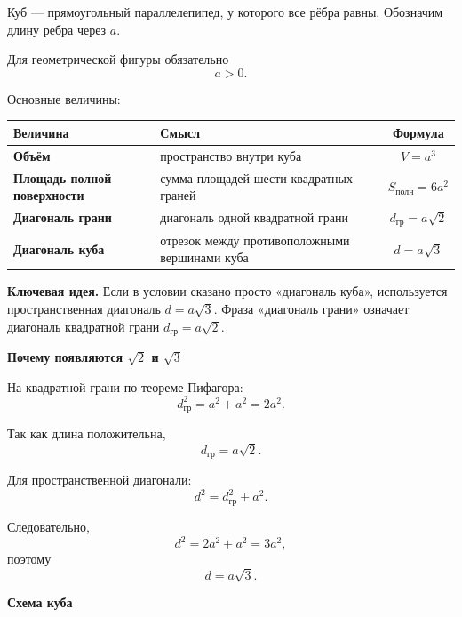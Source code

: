 \documentclass[a4paper,12pt]{article}
\newcommand{\subsectiontitle}[1]{%
    \vspace{0.4em}
    {\large\bfseries\color{darkaccent}#1}\par
    \vspace{0.2em}
}
\newcommand{\keyidea}[1]{%
    \par\medskip
    {\bfseries\color{darkaccent}Ключевая идея.} #1
    \par\medskip
}
\begin{document}
Куб --- прямоугольный параллелепипед, у которого все рёбра равны.
Обозначим длину ребра через \(a\).

Для геометрической фигуры обязательно
\[
a>0.
\]

Основные величины:

\begin{center}
\renewcommand{\arraystretch}{1.4}

\begin{tabularx}{0.94\linewidth}{@{}>{\bfseries}l X c@{}}
\toprule

Величина
&
Смысл
&
Формула
\\

\midrule

Объём
&
пространство внутри куба
&
\(V=a^3\)
\\

Площадь полной поверхности
&
сумма площадей шести квадратных граней
&
\(S_{\text{полн}}=6a^2\)
\\

Диагональ грани
&
диагональ одной квадратной грани
&
\(d_{\text{гр}}=a\sqrt2\)
\\

Диагональ куба
&
отрезок между противоположными вершинами куба
&
\(d=a\sqrt3\)
\\

\bottomrule
\end{tabularx}
\end{center}

\keyidea{
Если в условии сказано просто «диагональ куба», используется
пространственная диагональ \(d=a\sqrt3\).
Фраза «диагональ грани» означает диагональ квадратной грани
\(d_{\text{гр}}=a\sqrt2\).
}

\subsectiontitle{Почему появляются \(\sqrt2\) и \(\sqrt3\)}

На квадратной грани по теореме Пифагора:
\[
d_{\text{гр}}^2=a^2+a^2=2a^2.
\]

Так как длина положительна,
\[
d_{\text{гр}}=a\sqrt2.
\]

Для пространственной диагонали:
\[
d^2=d_{\text{гр}}^2+a^2.
\]

Следовательно,
\[
d^2=2a^2+a^2=3a^2,
\]
поэтому
\[
d=a\sqrt3.
\]

\subsectiontitle{Схема куба}
\end{document}
